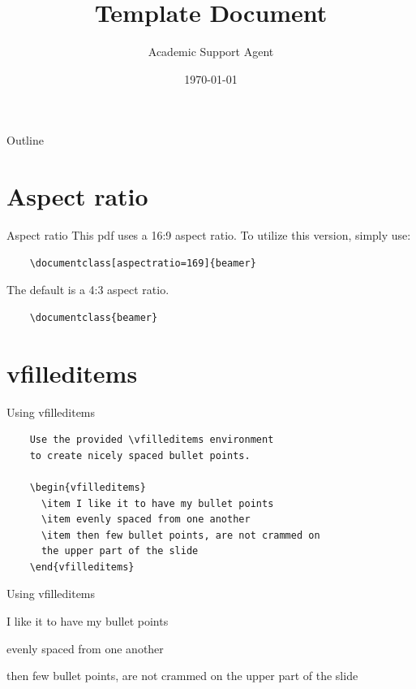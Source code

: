 \documentclass{article}
\title{Template Document}
\author{Academic Support Agent}
\date{\today}
\begin{document}
\maketitle

\maketitle

\begin{frame}{Outline}
  
\end{frame}

\section{Aspect ratio}
\begin{frame}[fragile]{Aspect ratio}
  This pdf uses a 16:9 aspect ratio. To utilize
  this version, simply use:
  \begin{verbatim}
    \documentclass[aspectratio=169]{beamer}
    \end{verbatim}
  \vfill
  The default is a 4:3 aspect ratio.
  \begin{verbatim}
    \documentclass{beamer}
  \end{verbatim}
\end{frame}

\section{vfilleditems}
\begin{frame}[fragile]{Using vfilleditems}
  \begin{verbatim}
    Use the provided \vfilleditems environment 
    to create nicely spaced bullet points.

    \begin{vfilleditems}
      \item I like it to have my bullet points
      \item evenly spaced from one another
      \item then few bullet points, are not crammed on 
      the upper part of the slide
    \end{vfilleditems}
    \end{verbatim}
\end{frame}

\begin{frame}{Using vfilleditems}
  \begin{vfilleditems}
    \item I like it to have my bullet points
    \item evenly spaced from one another
    \item then few bullet points, are not crammed on
    the upper part of the slide
  \end{vfilleditems}
\end{frame}
\end{document}
